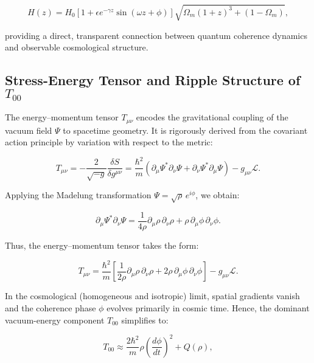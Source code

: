 \begin{equation}
H(z) = H_0\left[1 + \epsilon e^{-\gamma z}\sin(\omega z + \phi)\right]\sqrt{\Omega_m(1+z)^3+(1-\Omega_m)},
\label{eq:Hubble_ripple_appendix}
\end{equation}

providing a direct, transparent connection between quantum coherence dynamics and observable cosmological structure.

\subsection{Stress-Energy Tensor and Ripple Structure of \texorpdfstring{$T_{00}$}{T00}}
\label{app:tensor}

The energy–momentum tensor \( T_{\mu\nu} \) encodes the gravitational coupling of the vacuum field \( \Psi \) to spacetime geometry. It is rigorously derived from the covariant action principle by variation with respect to the metric:

\begin{equation}
T_{\mu\nu} = -\frac{2}{\sqrt{-g}} \frac{\delta S}{\delta g^{\mu\nu}} 
= \frac{\hbar^2}{m}\left(\partial_\mu\Psi^*\partial_\nu\Psi + \partial_\nu\Psi^*\partial_\mu\Psi\right) - g_{\mu\nu}\mathcal{L}.
\label{eq:stress_energy_general}
\end{equation}

Applying the Madelung transformation \( \Psi = \sqrt{\rho}\,e^{i\phi} \), we obtain:

\begin{equation}
\partial_\mu \Psi^*\partial_\nu\Psi = \frac{1}{4\rho}\partial_\mu\rho\,\partial_\nu\rho + \rho\,\partial_\mu\phi\,\partial_\nu\phi.
\label{eq:tmunu_madelung_term}
\end{equation}

Thus, the energy–momentum tensor takes the form:

\begin{equation}
T_{\mu\nu} = \frac{\hbar^2}{m}\left[\frac{1}{2\rho}\partial_\mu\rho\,\partial_\nu\rho + 2\rho\,\partial_\mu\phi\,\partial_\nu\phi\right] - g_{\mu\nu}\mathcal{L}.
\label{eq:stress_energy_expanded}
\end{equation}

In the cosmological (homogeneous and isotropic) limit, spatial gradients vanish and the coherence phase \(\phi\) evolves primarily in cosmic time. Hence, the dominant vacuum-energy component \(T_{00}\) simplifies to:

\begin{equation}
T_{00} \approx \frac{2\hbar^2}{m}\rho\left(\frac{d\phi}{dt}\right)^2 + Q(\rho),
\label{eq:t00_basic}
\end{equation}

